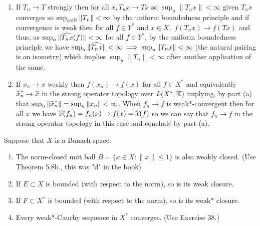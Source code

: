 \documentclass[12pt,a4paper]{article}
\begin{document}
\begin{solution}
    \begin{enumerate}[label=\alph*.]
        \item If $T_n\to T$ strongly then for all $x,T_nx\to Tx$ so $\sup_n\|T_nx\|<\infty$ given $T_nx$ converges so $\sup_{n\in\mathbb{N}}\|T_n\|<\infty$ by the uniform boundedness principle and if convergence is weak then for all $f\in Y^*$ and $x\in X,$ $f(T_nx)\to f(Tx)$ and thus, as $\sup_n\|\widehat{T_nx}(f)\|<\infty$ for all $f\in Y^*$, by the uniform boundedness principle we have $\sup_n\|\widehat{T_nx}\|<\infty\implies\sup_n\|T_nx\|<\infty$ (the natural pairing is an isometry) which implies $\sup_n\|T_n\|<\infty$ after another application of the same. 
        \item If $x_n\to x$ weakly then $f(x_n)\to f(x)$ for all $f\in X^*$ and equivalently $\widehat{x_n}\to\widehat{x}$ in the strong operator topology over $L(X^*,\mathbb{K})$ implying, by part (a) that $\sup_n\|\widehat{x_n}\|=\sup_n\|x_n\|<\infty$. 
            When $f_n\to f$ is weak*-convergent then for all $x$ we have $\widehat{x}(f_n)=f_n(x)\to f(x)=\widehat{x}(f)$ so we can say that $f_n\to f$ in the strong operator topology in this case and conclude by part (a).  
    \end{enumerate}
\end{solution}
\begin{problem}\label{prob:5-48}
Suppose that $X$ is a Banach space.
\begin{enumerate}[label=\alph*.]
\item The norm-closed unit ball $B = \{x \in X : \|x\| \le 1\}$ is also weakly closed. (Use Theorem 5.8b., this was "d" in the book)
\item If $E \subset X$ is bounded (with respect to the norm), so is its weak closure.
\item If $F \subset X^*$ is bounded (with respect to the norm), so is its weak* closure.
\item Every weak*-Cauchy sequence in $X^*$ converges. (Use Exercise 38.)
\end{enumerate}
\end{problem}
\end{document}
